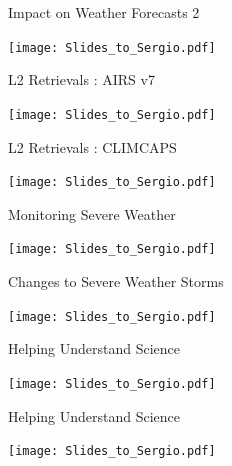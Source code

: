 \documentclass[10pt,t]{beamer}
\begin{document}
\begin{frame}{Impact on Weather Forecasts 2}
\vspace{-0.35in}
\begin{center}
%
\texttt{[image: Slides\_to\_Sergio.pdf]}
\end{center}
\end{frame}

\begin{frame}{L2 Retrievals : AIRS v7 }
\vspace{-0.35in}
\begin{center}
\texttt{[image: Slides\_to\_Sergio.pdf]}
\end{center}
\end{frame}

\begin{frame}{L2 Retrievals : CLIMCAPS}
\vspace{-0.35in}
\begin{center}
\texttt{[image: Slides\_to\_Sergio.pdf]}
\end{center}
\end{frame}

\begin{frame}{Monitoring Severe Weather}
\vspace{-0.35in}
\begin{center}
\texttt{[image: Slides\_to\_Sergio.pdf]}
\end{center}
\end{frame}

\begin{frame}{Changes to Severe Weather Storms}
\vspace{-0.35in}
\begin{center}
\texttt{[image: Slides\_to\_Sergio.pdf]}
\end{center}
\end{frame}

\begin{frame}{Helping Understand Science}
\vspace{-0.35in}
\begin{center}
\texttt{[image: Slides\_to\_Sergio.pdf]}
\end{center}
\end{frame}

\begin{frame}{Helping Understand Science}
\vspace{-0.35in}
\begin{center}
\texttt{[image: Slides\_to\_Sergio.pdf]}
\end{center}
\end{frame}
\end{document}
